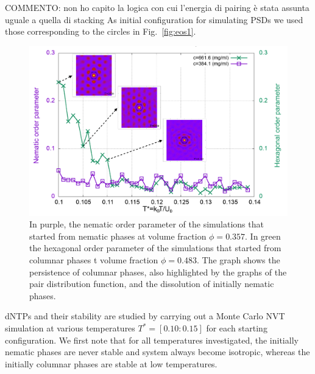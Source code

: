 \documentclass[aip,jcp, amsmath, amssymb, reprint]{revtex4-1}
\begin{document}
{\color{red} COMMENTO: non ho capito la logica con cui l'energia di pairing è stata assunta
uguale a quella di stacking}
As initial configuration for simulating PSDs we used those corresponding to the circles in Fig.~\ref{fig:eos1}.
\begin{figure}[h!]
\includegraphics[width=0.99\linewidth]{par.png}
\caption{\label{fig:par} In purple, the nematic order parameter of the simulations that started from nematic phases at volume fraction $\phi=0.357$. In green the hexagonal order parameter of the simulations that started from columnar phases t volume fraction $\phi=0.483$. The graph shows the persistence of columnar phases, also highlighted by the graphs of the pair distribution function, and the dissolution of initially nematic phases.}
\end{figure}


dNTPs and their stability are studied by carrying out a Monte Carlo NVT simulation at various temperatures $T^*=[0.10:0.15]$
for each starting configuration. We first note that for all temperatures investigated, the initially nematic phases are never stable and system always become isotropic, whereas the initially columnar phases are stable at low temperatures.  
\end{document}
